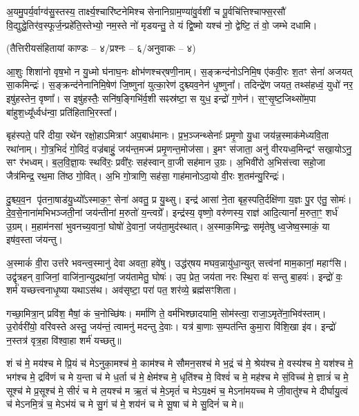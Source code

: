 अ॒यमु॒पर्य॒र्वाग्व॑सु॒स्तस्य॒ तार्क्ष्य॒श्चारि॑ष्टनेमिश्च  सेनानि\-ग्राम॒ण्या॑वु॒र्वशी॑ च
पू॒र्वचि॑त्तिश्चाफ्स॒रसौ॑ वि॒द्युद्धे॒तिर॑व॒\-स्फूर्ज॒न्प्रहे॑ति॒स्तेभ्यो॒
नम॒स्ते नो॑ मृडयन्तु॒ ते यं द्वि॒ष्मो यश्च॑ नो॒ द्वेष्टि॒ तं वो॒  जम्भे दधामि।


\centerline{\scriptsize (तैत्तिरीयसंहितायां काण्डः – ४/प्रश्नः – ६/अनुवाकः – ४)}

आ॒शुः शिशा॑नो वृष॒भो न यु॒ध्मो घ॑नाघ॒नः क्षोभ॑णश्चर्‌षणी॒नाम्। स॒ङ्क्रन्द॑नोऽनिमि॒ष ए॑कवी॒रः श॒तꣳ सेना॑ अजयत् सा॒कमिन्द्रः॑। स॒ङ्क्रन्द॑नेनानिमि॒षेण॑ जि॒ष्णुना॑ युत्का॒रेण॑ दुश्च्यव॒नेन॑ धृ॒ष्णुना᳚। तदिन्द्रे॑ण जयत॒ तथ्स॑हध्वं॒ युधो॑ नर॒ इषु॑हस्तेन॒ वृष्णा᳚। स इषु॑हस्तैः॒ सनि॑ष॒ङ्गिभि॑र्व॒शी सꣴस्र॑ष्टा॒ स युध॒ इन्द्रो॑ ग॒णेन॑। स॒ꣳ॒सृ॒ष्ट॒जिथ्सो॑म॒पा बा॑हुश॒ध्यू᳚र्ध्वध॑न्वा॒ प्रति॑हिताभि॒रस्ता᳚।

बृह॑स्पते॒ परि॑ दीया॒ रथे॑न रक्षो॒हाऽमित्राꣳ॑ अप॒बाध॑मानः। प्र॒भ॒ञ्जन्थ्सेनाः᳚ प्रमृ॒णो यु॒धा जय॑न्न॒स्माक॑मेध्यवि॒ता रथा॑नाम्। गो॒त्र॒भिदं॑ गो॒विदं॒ वज्र॑बाहुं॒ जय॑न्त॒मज्म॑ प्रमृ॒णन्त॒मोज॑सा। इ॒मꣳ स॑जाता॒ अनु॑ वीरयध्व॒मिन्द्रꣳ॑ सखा॒योऽनु॒ सꣳ र॑भध्वम्। ब॒ल॒वि॒ज्ञा॒यः स्थवि॑रः॒ प्रवी॑रः॒ सह॑स्वान् वा॒जी सह॑मान उ॒ग्रः। अ॒भिवी॑रो अ॒भिस॑त्त्वा सहो॒जा जैत्र॑मिन्द्र॒ रथ॒मा ति॑ष्ठ गो॒वित्। अ॒भि गो॒त्राणि॒ सह॑सा॒ गाह॑मानोऽदा॒यो वी॒रः श॒तम॑न्यु॒रिन्द्रः॑।

दु॒श्च्य॒व॒न पृ॑तना॒षाड॑यु॒ध्यो᳚ऽस्माक॒ꣳ॒ सेना॑ अवतु॒ प्र यु॒थ्सु। इन्द्र॑ आसां ने॒ता बृह॒स्पति॒र्दक्षि॑णा य॒ज्ञः पु॒र ए॑तु॒ सोमः॑। दे॒व॒से॒नाना॑मभिभञ्जती॒नां जय॑न्तीनां म॒रुतो॑ य॒न्त्वग्रे᳚। इन्द्र॑स्य॒ वृष्णो॒ वरु॑णस्य॒ राज्ञ॑ आदि॒त्यानां᳚ म॒रुता॒ꣳ॒ शर्ध॑ उ॒ग्रम्। म॒हाम॑नसां भुवनच्य॒वानां॒ घोषो॑ दे॒वानां॒ जय॑ता॒मुद॑स्थात्। अ॒स्माक॒मिन्द्रः॒ समृ॑तेषु ध्व॒जेष्व॒स्माकं॒ या इष॑व॒स्ता ज॑यन्तु।

अ॒स्माकं॑ वी॒रा उत्त॑रे भवन्त्व॒स्मानु॑ देवा अवता॒ हवे॑षु। उद्ध॑र्‌षय मघव॒न्नायु॑धा॒न्युत् सत्त्व॑नां माम॒कानां॒ महाꣳ॑सि। उद्वृ॑त्रहन् वा॒जिनां॒ वाजि॑ना॒न्युद्रथा॑नां॒ जय॑तामेतु॒ घोषः॑। उप॒ प्रेत॒ जय॑ता नरः स्थि॒रा वः॑ सन्तु बा॒हवः॑। इन्द्रो॑ वः॒ शर्म॑ यच्छत्त्वनाधृ॒ष्या यथाऽस॑थ। अव॑सृष्टा॒ परा॑ पत॒ शर॑व्ये॒ ब्रह्म॑सꣳशिता।

गच्छा॒मित्रा॒न् प्रवि॑श॒ मैषां॒ कं च॒नोच्छि॑षः। मर्मा॑णि ते॒ वर्म॑भिश्छादयामि॒ सोम॑स्त्वा॒ राजा॒ऽमृते॑ना॒भिव॑स्ताम्। उ॒रोर्वरी॑यो॒ वरि॑वस्ते अस्तु॒ जय॑न्तं॒ त्वामनु॑ मदन्तु दे॒वाः। यत्र॑ बा॒णाः स॒म्पत॑न्ति कुमा॒रा वि॑शि॒खा इ॑व। इन्द्रो॑ न॒स्तत्र॑ वृत्र॒हा वि॑श्वा॒हा शर्म॑ यच्छतु॥

शं च॑ मे॒ मय॑श्च मे प्रि॒यं च॑ मेऽनुका॒मश्च॑ मे॒ काम॑श्च मे सौमन॒सश्च॑ मे भ॒द्रं च॑ मे॒ श्रेय॑श्च मे॒ वस्य॑श्च मे॒ यश॑श्च मे॒ भग॑श्च मे॒ द्रवि॑णं च मे य॒न्ता च॑ मे ध॒र्ता च॑ मे॒ क्षेम॑श्च मे॒ धृति॑श्च मे॒ विश्वं॑ च मे॒ मह॑श्च मे सं॒विच्च॑ मे॒ ज्ञात्रं॑ च मे॒ सूश्च॑ मे प्र॒सूश्च॑ मे॒ सीरं॑ च मे ल॒यश्च॑ म ऋ॒तं च॑ मे॒ऽमृतं॑ च मेऽय॒क्ष्मं च॒ मेऽना॑मयच्च मे जी॒वातु॑श्च मे दीर्घायु॒त्वं च॑ मेऽनमि॒त्रं च॒ मेऽभ॑यं च मे सु॒गं च॑ मे॒ शय॑नं च मे सू॒षा च॑ मे सु॒दिनं॑ च मे॥

